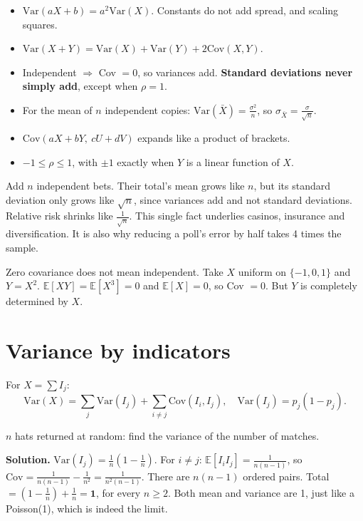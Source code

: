 \documentclass[11pt,a4paper,openany]{report}
\newcommand{\E}{\mathbb{E}}
\begin{document}
\begin{idea}
\begin{itemize}[nosep]
\item $\text{Var}(aX+b)=a^2\text{Var}(X)$. Constants do not add spread, and scaling squares.
\item $\text{Var}(X+Y)=\text{Var}(X)+\text{Var}(Y)+2\text{Cov}(X,Y)$.
\item Independent $\Rightarrow$ Cov $=0$, so variances add. \textbf{Standard deviations never simply add}, except when $\rho=1$.
\item For the mean of $n$ independent copies: $\text{Var}(\bar X)=\frac{\sigma^2}n$, so $\sigma_{\bar X}=\frac\sigma{\sqrt n}$.
\item $\text{Cov}(aX+bY,\ cU+dV)$ expands like a product of brackets.
\item $-1\le\rho\le1$, with $\pm1$ exactly when $Y$ is a linear function of $X$.
\end{itemize}
\end{idea}

\begin{why}
Add $n$ independent bets. Their total's mean grows like $n$, but its standard deviation only grows like $\sqrt n$, since variances add and not standard deviations. Relative risk shrinks like $\frac1{\sqrt n}$. This single fact underlies casinos, insurance and diversification. It is also why reducing a poll's error by half takes 4 times the sample.
\end{why}

\begin{trap}
Zero covariance does not mean independent. Take $X$ uniform on $\{-1,0,1\}$ and $Y=X^2$. $\E[XY]=\E[X^3]=0$ and $\E[X]=0$, so Cov $=0$. But $Y$ is completely determined by $X$.
\end{trap}

\section{Variance by indicators}
For $X=\sum I_j$:
\[\text{Var}(X)=\sum_j\text{Var}(I_j)+\sum_{i\ne j}\text{Cov}(I_i,I_j),\quad\text{Var}(I_j)=p_j(1-p_j).\]
\begin{example}
$n$ hats returned at random: find the variance of the number of matches.

\textbf{Solution.} $\text{Var}(I_j)=\frac1n\left(1-\frac1n\right)$. For $i\ne j$: $\E[I_iI_j]=\frac1{n(n-1)}$, so $\text{Cov}=\frac1{n(n-1)}-\frac1{n^2}=\frac1{n^2(n-1)}$. There are $n(n-1)$ ordered pairs. Total $=\left(1-\frac1n\right)+\frac1n=\mathbf{1}$, for every $n\ge2$. Both mean and variance are 1, just like a Poisson(1), which is indeed the limit.
\end{example}
\end{document}
